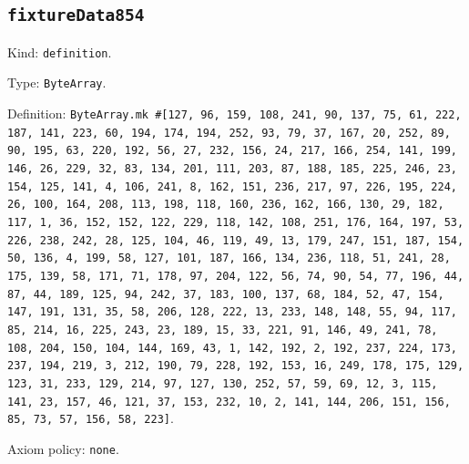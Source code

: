 \documentclass[11pt]{article}
\begin{document}
\subsection*{\texttt{fixtureData854}}
\noindent Kind: \texttt{definition}.\par
\noindent Type: \texttt{ByteArray}.\par
\noindent Definition: \texttt{ByteArray.mk \#[127, 96, 159, 108, 241, 90, 137, 75, 61, 222, 187, 141, 223, 60, 194, 174, 194, 252, 93, 79, 37, 167, 20, 252, 89, 90, 195, 63, 220, 192, 56, 27, 232, 156, 24, 217, 166, 254, 141, 199, 146, 26, 229, 32, 83, 134, 201, 111, 203, 87, 188, 185, 225, 246, 23, 154, 125, 141, 4, 106, 241, 8, 162, 151, 236, 217, 97, 226, 195, 224, 26, 100, 164, 208, 113, 198, 118, 160, 236, 162, 166, 130, 29, 182, 117, 1, 36, 152, 152, 122, 229, 118, 142, 108, 251, 176, 164, 197, 53, 226, 238, 242, 28, 125, 104, 46, 119, 49, 13, 179, 247, 151, 187, 154, 50, 136, 4, 199, 58, 127, 101, 187, 166, 134, 236, 118, 51, 241, 28, 175, 139, 58, 171, 71, 178, 97, 204, 122, 56, 74, 90, 54, 77, 196, 44, 87, 44, 189, 125, 94, 242, 37, 183, 100, 137, 68, 184, 52, 47, 154, 147, 191, 131, 35, 58, 206, 128, 222, 13, 233, 148, 148, 55, 94, 117, 85, 214, 16, 225, 243, 23, 189, 15, 33, 221, 91, 146, 49, 241, 78, 108, 204, 150, 104, 144, 169, 43, 1, 142, 192, 2, 192, 237, 224, 173, 237, 194, 219, 3, 212, 190, 79, 228, 192, 153, 16, 249, 178, 175, 129, 123, 31, 233, 129, 214, 97, 127, 130, 252, 57, 59, 69, 12, 3, 115, 141, 23, 157, 46, 121, 37, 153, 232, 10, 2, 141, 144, 206, 151, 156, 85, 73, 57, 156, 58, 223]}.\par
\noindent Axiom policy: \texttt{none}.\par
\end{document}
